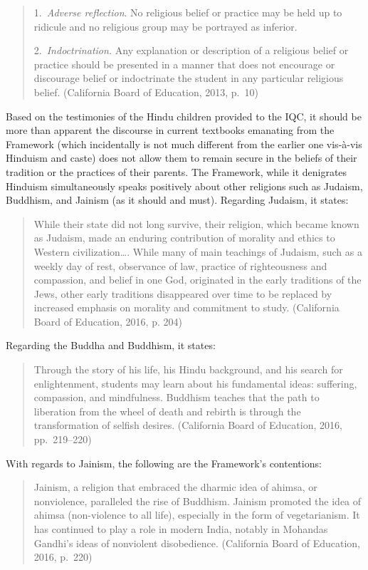 \begin{quote}
1.\ \textit{Adverse reflection}. No religious belief or practice may be held up to ridicule and no religious group may be portrayed as inferior.

2.\ \textit{Indoctrination.} Any explanation or description of a religious belief or practice should be presented in a manner that does not encourage or discourage belief or indoctrinate the student in any particular religious belief. (California Board of Education, 2013, p.~10)
\end{quote}
Based on the testimonies of the Hindu children provided to the IQC, it should be more than apparent the discourse in current textbooks emanating from the Framework (which incidentally is not much different from the earlier one vis-à-vis Hinduism and caste) does not allow them to remain secure in the beliefs of their tradition or the practices of their parents. The Framework, while it denigrates Hinduism simultaneously speaks positively about other religions such as Judaism, Buddhism, and Jainism (as it should and must). Regarding Judaism, it states:
\begin{quote}
While their state did not long survive, their religion, which became known as Judaism, made an enduring contribution of morality and ethics to Western civilization…. While many of main teachings of Judaism, such as a weekly day of rest, observance of law, practice of righteousness and compassion, and belief in one God, originated in the early traditions of the Jews, other early traditions disappeared over time to be replaced by increased emphasis on morality and commitment to study. (California Board of Education, 2016, p. 204)
\end{quote}
Regarding the Buddha and Buddhism, it states: 
\begin{quote}
Through the story of his life, his Hindu background, and his search for enlightenment, students may learn about his fundamental ideas: suffering, compassion, and mindfulness. Buddhism teaches that the path to liberation from the wheel of death and rebirth is through the transformation of selfish desires. (California Board of Education, 2016, pp.\ 219--220) 
\end{quote}
With regards to Jainism, the following are the Framework’s contentions:
\begin{quote}
Jainism, a religion that embraced the dharmic idea of ahimsa, or nonviolence, paralleled the rise of Buddhism. Jainism promoted the idea of ahimsa (non-violence to all life), especially in the form of vegetarianism. It has continued to play a role in modern India, notably in Mohandas Gandhi’s ideas of nonviolent disobedience. (California Board of Education, 2016, p.\ 220)
\end{quote}
